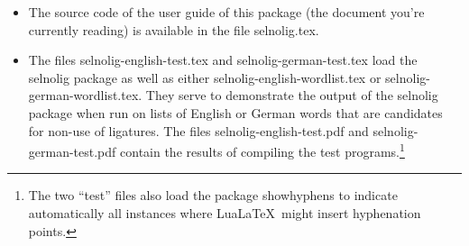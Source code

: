 \documentclass[12pt]{article}
\newcommand{\pkg}[1]{\textsf{#1}}
\newcommand{\opt}[1]{\texttt{#1}}
\newcommand{\cmmd}[1]{\texttt{\textbackslash #1}}
\begin{document}
\begin{itemize}
\begin{itemize}
\item If the \opt{english} option (or one of its synonymous options) is set, the files \pkg{selnolig-english-patterns.sty} and \pkg{selnolig-english-hyphex.sty} are loaded. The former file contains a long list of \cmmd{nolig} macros adapted to English language typographic usage,  provides a complete listing of these macros. The latter file contains a list of hyphenation exceptions, mainly for words that contain one or more potential non-ligation points and for which \TeX's hypenation algorithm either misses valid hyphenation points or selects invalid hyphenation points, see \cref{sec:addlhyph} below.

\item If the \opt{ngerman} option (or one of its synonymous options) is set, the files \pkg{selnolig-german-patterns.sty} and \pkg{selnolig-german-hyphex.sty} are loaded. The former file contains ligature-suppressing instructions appropriate for German typographic usage, \cref{sec:germ-listing} lists its contents. The latter file provides additional hyphenation rules for German-language words.

\item If the user specifies both the \opt{english} and \opt{ngerman} options (and or some of their synonymous options), \emph{both} language-specific style files will be loaded. Under normal circumstances, a user will probably want to load only one or the other set of language-specific files, but not both sets.
\end{itemize}

\item The source code of the user guide of this package (the document you're currently reading) is available in the file \pkg{selnolig.tex}. 

\item The files \pkg{selnolig-english-test.tex} and \pkg{selnolig-german-test.tex} load the \pkg{selnolig} package as well as either \pkg{selnolig-english-wordlist.tex} or \pkg{selnolig-german-wordlist.tex}. They serve to demonstrate the output of the \pkg{selnolig} package when run on lists of English or German words that are candidates for non-use of ligatures. The files \pkg{selnolig-english-test.pdf} and \pkg{selnolig-german-test.pdf} contain the results of compiling the test programs.\footnote{The two \enquote{test} files also load the package \pkg{showhyphens} to indicate automatically all instances where Lua\LaTeX\ might insert hyphenation points.}

\end{itemize}
\end{document}
